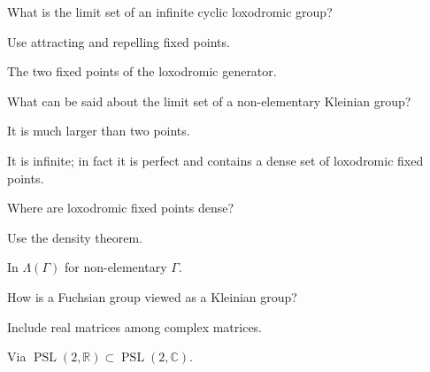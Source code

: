 \begin{exercise}\label{exr:vii37-10}
What is the limit set of an infinite cyclic loxodromic group?
\end{exercise}

\begin{hint}
Use attracting and repelling fixed points.
\end{hint}

\begin{solution}
The two fixed points of the loxodromic generator.
\end{solution}

\begin{exercise}\label{exr:vii37-11}
What can be said about the limit set of a non-elementary Kleinian group?
\end{exercise}

\begin{hint}
It is much larger than two points.
\end{hint}

\begin{solution}
It is infinite; in fact it is perfect and contains a dense set of loxodromic fixed points.
\end{solution}

\begin{exercise}\label{exr:vii37-12}
Where are loxodromic fixed points dense?
\end{exercise}

\begin{hint}
Use the density theorem.
\end{hint}

\begin{solution}
In \(\Lambda(\Gamma)\) for non-elementary \(\Gamma\).
\end{solution}

\begin{exercise}\label{exr:vii37-13}
How is a Fuchsian group viewed as a Kleinian group?
\end{exercise}

\begin{hint}
Include real matrices among complex matrices.
\end{hint}

\begin{solution}
Via \(\operatorname{PSL}(2,\mathbb R)\subset\operatorname{PSL}(2,\mathbb C)\).
\end{solution}


